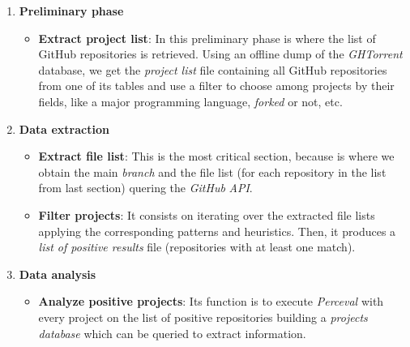 \documentclass[a4paper, 12pt]{book}
\begin{document}
\begin{enumerate}
  \item \textbf{Preliminary phase}
    \begin{itemize}
      \item \textbf{Extract project list}:
            In this preliminary phase is where the list of GitHub repositories is retrieved. Using an offline dump of
            the \emph{GHTorrent} database, we get the \emph{project list} file containing all GitHub repositories from one of its tables
            and use a filter to choose among projects by their fields, like a major programming language, \textit{forked} or not, etc.
    \end{itemize}
  \item \textbf{Data extraction}
    \begin{itemize}
      \item \textbf{Extract file list}:
            This is the most critical section, because is where we obtain the main \textit{branch} and the file list
            (for each repository in the list from last section) quering the \emph{GitHub} \textit{API}.
      \item \textbf{Filter projects}:
            It consists on iterating over the extracted file lists applying the corresponding patterns and heuristics.
            Then, it produces a \emph{list of positive results} file (repositories with at least one match).
    \end{itemize}
  \item \textbf{Data analysis}
    \begin{itemize}
      \item \textbf{Analyze positive projects}:
            Its function is to execute \emph{Perceval} with every project on the list of positive repositories
            building a \emph{projects database} which can be queried to extract information.
    \end{itemize}
\end{enumerate}
\end{document}
